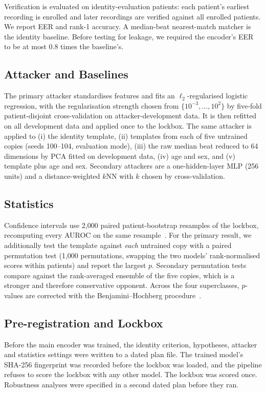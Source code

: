 \documentclass[journal]{IEEEtran}
\begin{document}
Verification is evaluated on identity-evaluation patients: each patient's earliest recording is enrolled and later recordings are verified against all enrolled patients. We report EER and rank-1 accuracy. A median-beat nearest-match matcher is the identity baseline. Before testing for leakage, we required the encoder's EER to be at most 0.8 times the baseline's.

\subsection{Attacker and Baselines}
The primary attacker standardises features and fits an $\ell_2$-regularised logistic regression, with the regularisation strength chosen from $\{10^{-3},\ldots,10^{2}\}$ by five-fold patient-disjoint cross-validation on attacker-development data. It is then refitted on all development data and applied once to the lockbox. The same attacker is applied to (i) the identity template, (ii) templates from each of five untrained copies (seeds 100--104, evaluation mode), (iii) the raw median beat reduced to 64 dimensions by PCA fitted on development data, (iv) age and sex, and (v) template plus age and sex. Secondary attackers are a one-hidden-layer MLP (256 units) and a distance-weighted $k$NN with $k$ chosen by cross-validation.

\subsection{Statistics}
Confidence intervals use 2{,}000 paired patient-bootstrap resamples of the lockbox, recomputing every AUROC on the same resample~\cite{efron1993bootstrap}. For the primary result, we additionally test the template against \emph{each} untrained copy with a paired permutation test (1{,}000 permutations, swapping the two models' rank-normalised scores within patients) and report the largest $p$. Secondary permutation tests compare against the rank-averaged ensemble of the five copies, which is a stronger and therefore conservative opponent. Across the four superclasses, $p$-values are corrected with the Benjamini--Hochberg procedure~\cite{benjamini1995controlling}.

\subsection{Pre-registration and Lockbox}
Before the main encoder was trained, the identity criterion, hypotheses, attacker and statistics settings were written to a dated plan file. The trained model's SHA-256 fingerprint was recorded before the lockbox was loaded, and the pipeline refuses to score the lockbox with any other model. The lockbox was scored once. Robustness analyses were specified in a second dated plan before they ran.
\end{document}
